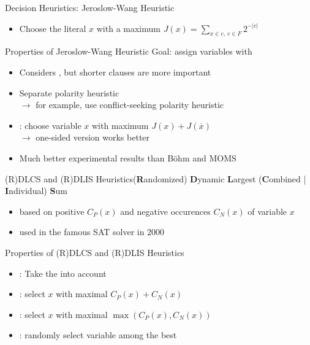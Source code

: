 \documentclass[t]{sdqbeamer2}
\begin{document}
\begin{frame}{Decision Heuristics: Jeroslow-Wang Heuristic}
\begin{itemize}\setlength{\itemsep}{1ex}
	\item Choose the literal $x$ with a maximum $J(x) = \sum_{x \in c,\ c \in F} 2^{-|c|}$
\end{itemize}
\begin{block}{Properties of Jeroslow-Wang Heuristic}
	Goal: assign variables with \\[1ex]
	\begin{itemize}\setlength{\itemsep}{1em}
		\item Considers , but shorter clauses are more important
		\item Separate polarity heuristic\\
		$\rightarrow$ for example, use conflict-seeking polarity heuristic
		\item {}: choose variable $x$ with maximum $J(x)+J(\overline{x})$\\
		$\rightarrow$ one-sided version works better
	\item Much better experimental results than B{\"o}hm and MOMS
\end{itemize}
\end{block}
\end{frame}
	
\begin{frame}{(R)DLCS and (R)DLIS Heuristics}{(\textbf{R}andomized) \textbf{D}ynamic \textbf{L}argest (\textbf{C}ombined | \textbf{I}ndividual) \textbf{S}um}
\begin{itemize}\setlength{\itemsep}{1ex}
	\item based on positive $C_P(x)$ and negative occurences $C_N(x)$ of variable $x$
	\item used in the famous SAT solver  in 2000
\end{itemize}
\begin{block}{Properties of (R)DLCS and (R)DLIS Heuristics}
\begin{itemize}\setlength{\itemsep}{1em}
	\item {}: Take the  into account
	\item {}: select $x$ with maximal $C_P(x)+C_N(x)$
	\item {}: select $x$ with maximal $\operatorname{max}(C_P(x),C_N(x))$
	\item {}: randomly select variable among the best
\end{itemize}
\end{block}
\end{frame}
	
\end{document}
